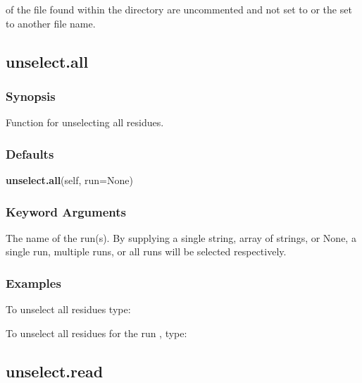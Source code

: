  of the file  found within the directory  are uncommented and not set to  or the  set to another file name. 
  

  

 \newpage 

 \subsection{unselect.all} 

  
 \subsubsection{Synopsis} 

 Function for unselecting all residues. 
  

  
 \subsubsection{Defaults} 

 \textsf{\textbf{unselect.all}(self, run=None)} 

  
 \subsubsection{Keyword Arguments} 

   The name of the run(s).  By supplying a single string, array of strings, or None, a single run, multiple runs, or all runs will be selected respectively.  

  

  
 \subsubsection{Examples} 

 To unselect all residues type: 
  


 To unselect all residues for the run , type: 
  



  

 \newpage 

 \subsection{unselect.read} 

